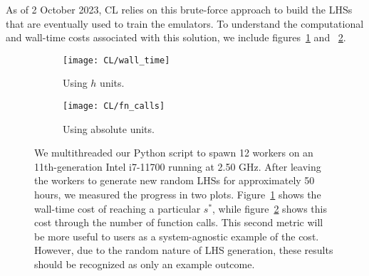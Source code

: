 
As of 2 October 2023, CL relies on this brute-force approach to build the
LHSs that are eventually used to train the emulators. To understand the 
computational and wall-time costs associated with this solution, we include 
figures~\ref{fig: wall_time} and ~\ref{fig: function_calls}.

\begin{figure}[ht!]
    \begin{subfigure}{0.45 \textwidth}
    \centering
 		\texttt{[image: CL/wall\_time]}
 		\caption{Using $h$ units.}
 		\label{fig: wall_time}
    \end{subfigure}
    \begin{subfigure}{0.45 \textwidth}
    \centering
 		\texttt{[image: CL/fn\_calls]}
 		\caption{Using absolute units.}
 		\label{fig: function_calls}
    \end{subfigure}
        \centering
    \caption[Efficiency of Brute-Force LHS Approach]{We multithreaded our 
    		Python script to spawn 12 workers on an 11th-generation Intel
    		i7-11700 running at 2.50 GHz. After leaving the workers to generate
    		new random LHSs for approximately 50 hours, we measured the progress
    		in two plots. Figure~\ref{fig: wall_time} shows the wall-time cost of
    		reaching a particular $s^*$, while figure~\ref{fig: function_calls}
    		shows this cost through the number of function calls. This second
    		metric will be more useful to users as a system-agnostic example of
    		the cost. However, due to the random nature of LHS generation, these
    		results should be recognized as only an example outcome.}
    \label{fig: random_lhs_performance}
\end{figure}

\begin{comment} %
we left the system to run for two days. In this time, the 
largest minimum separation that we generated was approximately 0.08022.  
Recall from section sec_B1 that the theoretical best possible value for this 
setup is approximately 0.24183. It would have been more meaningful if you had 
counted the total number of function calls, but it isn’t too late to set up 
such a run. So, even after assigning a relatively large amount of compute to 
this brute force solution, we fail to obtain an LHC of even a third of the 
best minimum separation.
\end{comment} 

